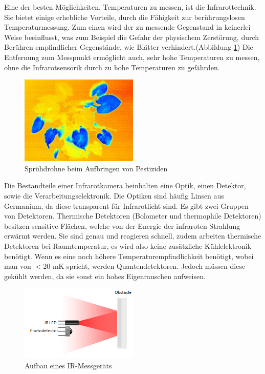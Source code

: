 Eine der besten Möglichkeiten, Temperaturen zu messen, ist die Infrarottechnik.
Sie bietet einige erhebliche Vorteile, durch die Fähigkeit zur berührungslosen
Temperaturmessung. Zum einen wird der zu messende Gegenstand in keinerlei Weise
beeinflusst, was zum Beispiel die Gefahr der physischem Zerstörung, durch
Berühren empfindlicher Gegenstände, wie Blätter verhindert.(Abbildung
\ref{fig:infrarot_pflanze}) Die Entfernung zum Messpunkt ermöglicht auch, sehr
hohe Temperaturen zu messen, ohne die Infrarotsensorik durch zu hohe
Temperaturen zu gefährden. \begin{figure}[!h]
	\centering
	\includegraphics[width=0.5\textwidth]{bilder/infrarot_pflanze.jpg}
	\caption[Sprühdrohne]{Sprühdrohne beim Aufbringen von Pestiziden}
	\label{fig:infrarot_pflanze}
\end{figure}

Die Bestandteile einer Infrarotkamera beinhalten
eine Optik, einen Detektor, sowie die Verarbeitungselektronik. Die Optiken sind
häufig Linsen aus Germanium, da diese transparent für Infrarotlicht sind. Es
gibt zwei Gruppen von Detektoren. Thermische Detektoren (Bolometer und
thermophile Detektoren) besitzen sensitive Flächen, welche von der Energie der
infraroten Strahlung erwärmt werden. Sie sind genau und reagieren schnell,
zudem arbeiten thermische Detektoren bei Raumtemperatur, es wird also keine
zusätzliche Kühlelektronik benötigt. Wenn es eine noch höhere
Temperaturempfindlichkeit benötigt, wobei man von $<$20 mK spricht, werden
Quantendetektoren. Jedoch müssen diese gekühlt werden, da sie sonst ein hohes
Eigenrauschen aufweisen.\cite{may2015transiente}

\begin{figure}[ht]
	\centering
	\includegraphics[width=0.5\textwidth]{bilder/infrarotsensor.png}
	\caption[Aufbau eines IR-Messgeräts]{Aufbau eines IR-Messgeräts}
	\label{fig:aufbau infrarotsensor}
\end{figure}

